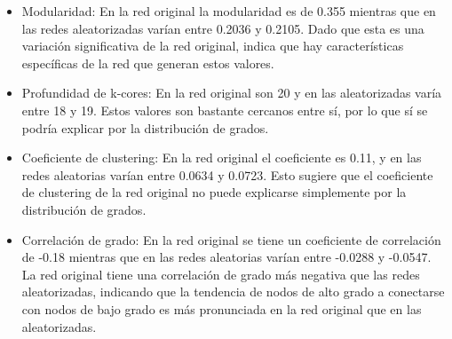 \documentclass[12pt]{article}
\begin{document}
\begin{itemize}
	\item Modularidad: En la red original la modularidad es de 0.355 mientras que en las redes aleatorizadas varían entre 0.2036 y 0.2105. Dado que esta es una variación significativa de la red original, indica que hay características específicas de la red que generan estos valores.

	\item Profundidad de k-cores: En la red original son 20 y en las aleatorizadas varía entre 18 y 19. Estos valores son bastante cercanos entre sí, por lo que sí se podría explicar por la distribución de grados.

	\item Coeficiente de clustering: En la red original el coeficiente es 0.11, y en las redes aleatorias varían entre 0.0634 y 0.0723. Esto sugiere que el coeficiente de clustering de la red original no puede explicarse simplemente por la distribución de grados.

	\item Correlación de grado: En la red original se tiene un coeficiente de correlación de  -0.18 mientras que en las redes aleatorias varían entre -0.0288 y -0.0547. La red original tiene una correlación de grado más negativa que las redes aleatorizadas, indicando que la tendencia de nodos de alto grado a conectarse con nodos de bajo grado es más pronunciada en la red original que en las aleatorizadas.
\end{itemize}
\end{document}
